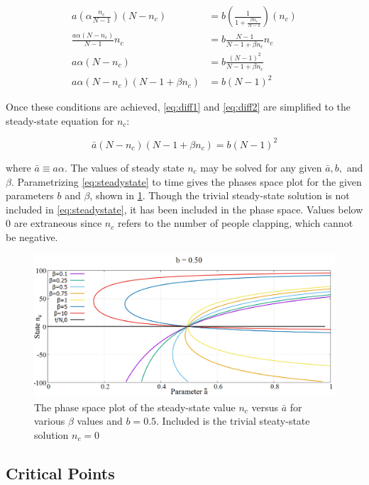 \begin{align}
a(\alpha\frac{n_{c}}{N-1})(N - n_{c}) &= b(\frac{1}{1 + \frac{\beta n_{c}}{N-1}})(n_{c}) \\
\frac{a\alpha (N - n_{c})}{N-1}n_{c} &= b\frac{N-1}{N-1+\beta n_{c}}n_{c} \\
a\alpha (N - n_{c}) &= b\frac{(N-1)^2}{N-1+\beta n_{c}} \\
a\alpha(N-n_{c})(N-1 + \beta n_{c}) & = b(N-1)^{2}
\end{align}
%


Once these conditions are achieved, \eqref{eq:diff1} and \eqref{eq:diff2} are simplified to the steady-state equation for $n_c$:

\begin{equation}\label{eq:steadystate}
\bar{a}(N-n_{c})(N-1 + \beta n_{c}) = b(N-1)^{2}
\end{equation}

where $\bar{a}\equiv a\alpha$. 
The values of steady state $n_{c}$ may be solved for any given $\bar{a},b,$ and $\beta$.
Parametrizing \eqref{eq:steadystate} to time gives the phases space plot for the given parameters $b$ and $\beta$, shown in  \ref{fig:phaseSpace}.
Though the trivial steady-state solution is not included in \eqref{eq:steadystate}, it has been included in the phase space.
Values below $0$ are extraneous since $n_{c}$ refers to the number of people clapping, which cannot be negative.

\begin{figure}
 \centering
  \includegraphics[width=\linewidth]{images/chapter3/phaseSpace.png}
  \caption{The phase space plot of the steady-state value $n_{c}$ versus $\bar{a}$ for various $\beta$ values and $b = 0.5$. Included is the trivial steaty-state solution $n_{c} = 0$}
  \label{fig:phaseSpace}
\end{figure}



\subsection{Critical Points}

